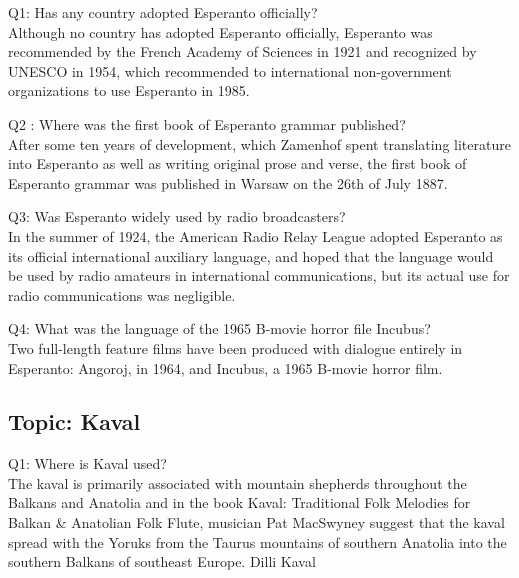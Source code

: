 \documentclass[12pt]{article}
\begin{document}
Q1: Has any country adopted Esperanto officially? \\
Although no country has adopted Esperanto officially, Esperanto was recommended by the French Academy of Sciences in 1921 and recognized by UNESCO in 1954, which recommended to international non-government organizations to use Esperanto in 1985.

Q2 : Where was the first book of Esperanto grammar published? \\
After some ten years of development, which Zamenhof spent translating literature into Esperanto as well as writing original prose and verse, the first book of Esperanto grammar was published in Warsaw on the 26th of July 1887.

Q3: Was Esperanto widely used by radio broadcasters? \\
In the summer of 1924, the American Radio Relay League adopted Esperanto as its official international auxiliary language, and hoped that the language would be used by radio amateurs in international communications, but its actual use for radio communications was negligible.

Q4: What was the language of the 1965 B-movie horror file Incubus? \\
Two full-length feature films have been produced with dialogue entirely in Esperanto: Angoroj, in 1964, and Incubus, a 1965 B-movie horror film.


\subsection{Topic: Kaval} 

Q1: Where is Kaval used? \\
The kaval is primarily associated with mountain shepherds throughout the Balkans and Anatolia and in the book Kaval: Traditional Folk Melodies for Balkan \& Anatolian Folk Flute, musician Pat MacSwyney suggest that the kaval spread with the Yoruks from the Taurus mountains of southern Anatolia into the southern Balkans of southeast Europe.
Dilli Kaval



\end{document}
